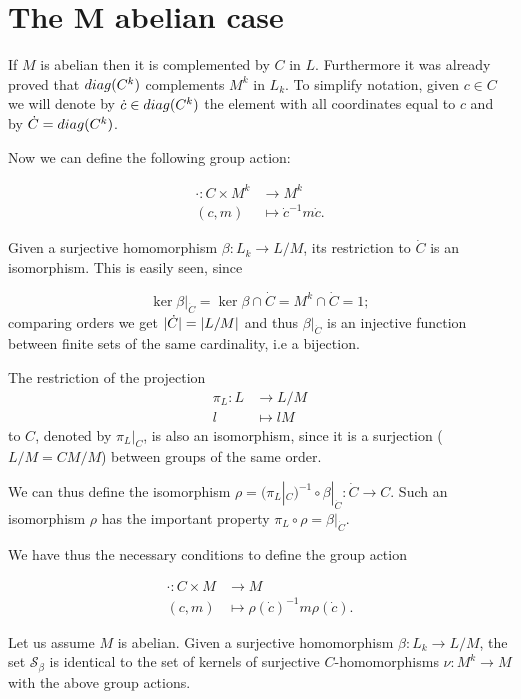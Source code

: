 \section{The M abelian case}

\newcommand{\dc}[0]{\dot{c}}

If $M$ is abelian then it is complemented by $C$ in $L$. Furthermore it was already proved that $diag({C^k})$ complements $M^k$ in $L_k$. To simplify notation, given $c \in C$ we will denote by $\dc \in \diag{C^k}$ the element with all coordinates equal to $c$ and by $\dot{C} = diag({C^k})$.

Now we can define the following group action:

\begin{align*}
    \cdot \colon C \times M^k &\rightarrow M^k \\
                (c, m)  &\mapsto \dc^{-1}m\dc.
\end{align*}

Given a surjective homomorphism $\beta \colon L_k \rightarrow L/M$, its restriction to $\dot{C}$ is an isomorphism. This is easily seen, since

$$
\ker{\beta|_{\dot C}} = \ker \beta \cap \dot{C} = M^k \cap \dot{C} = 1;
$$ comparing orders we get $| \dot{C} | = | L/M |$ and thus $\beta|_{\dot C}$ is an injective function between finite sets of the same cardinality, i.e a bijection. 

The restriction of the projection
\begin{align*}
    \pi_L \colon L &\rightarrow L/M \\
                 l &\mapsto lM
\end{align*}
to $C$, denoted by $\pi_L|_C$, is also an isomorphism, since it is a surjection ($L/M = CM/M$) between groups of the same order.

We can thus define the isomorphism $\rho = (\pi_L|_C)^{-1} \circ \beta|_{\dot C} \colon \dot{C} \rightarrow C$. Such an isomorphism $\rho$ has the important property $\pi_L \circ \rho = \beta|_{\dot C}$.

We have thus the necessary conditions to define the group action

\begin{align*}
    \cdot \colon C \times M &\rightarrow M \\
                (c, m)  &\mapsto \rho(\dc)^{-1}m\rho(\dc).
\end{align*}


\begin{theorem}
    \label{S4:LMhom}
    Let us assume $M$ is abelian. Given a surjective homomorphism $\beta \colon L_k \rightarrow L/M$, the set $\mathscr{S}_\beta$ is identical to the set of kernels of surjective $C$-homomorphisms $\nu \colon M^k \rightarrow M$ with the above group actions.
\end{theorem}

